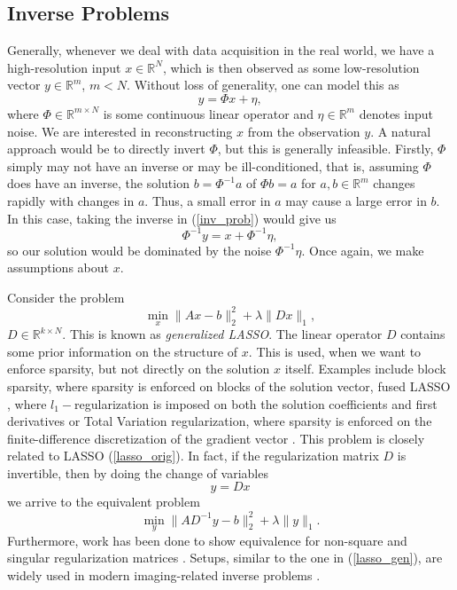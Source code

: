 \documentclass[11pt, twoside]{report}
\begin{document}
\subsection{Inverse Problems}
Generally, whenever we deal with data acquisition in the real world, we have a high-resolution input $x \in \mathbb{R}^N$, which is then observed as some low-resolution vector $y \in \mathbb{R}^m$, $m<N$. Without loss of generality, one can model this as
\begin{equation} \label{inv_prob}
    y = \Phi x + \eta,
\end{equation}
where $\Phi \in \mathbb{R}^{m \times N}$ is some continuous linear operator and $\eta \in \mathbb{R}^m$ denotes input noise. We are interested in reconstructing $x$ from the observation $y$. A natural approach would be to directly invert $\Phi$, but this is generally infeasible. Firstly, $\Phi$ simply may not have an inverse or may be ill-conditioned, that is, assuming $\Phi$ does have an inverse, the solution $b = \Phi^{-1} a$ of $\Phi b  = a$ for $a,b \in \mathbb{R}^m$ changes rapidly with changes in $a$. Thus, a small error in $a$ may cause a large error in $b$. In this case, taking the inverse in (\ref{inv_prob}) would give us
\begin{equation} \label{inv_ill}
    \Phi^{-1}y = x + \Phi^{-1}\eta,
\end{equation}
so our solution would be dominated by the noise $\Phi^{-1}\eta$. Once again, we make assumptions about $x$. 

Consider the problem
\begin{equation} \label{lasso_gen}
    \min_x  \|Ax-b\|_2^2 + \lambda\|Dx\|_1,
\end{equation}
$D \in \mathbb{R}^{k \times N}$. This is known as \textit{generalized LASSO}. The linear operator $D$ contains some prior information on the structure of $x$. This is used, when we want to enforce sparsity, but not directly on the solution $x$ itself. Examples include block sparsity, where sparsity is enforced on blocks of the solution vector, fused LASSO \cite{tibshirani_fused}, where $l_1-$regularization is imposed on both the solution coefficients and first derivatives or Total Variation regularization, where sparsity is enforced on the finite-difference discretization of the gradient vector \cite{chambolle}. This problem is closely related to LASSO (\ref{lasso_orig}). In fact, if the regularization matrix $D$ is invertible, then by doing the change of variables
\[y = Dx\]
we arrive to the equivalent problem
\begin{equation} \label{lasso_equiv}
    \min_y  \|AD^{-1}y-b\|_2^2 + \lambda\|y\|_1.
\end{equation}
Furthermore, work has been done to show equivalence for non-square and singular regularization matrices \cite{gen_lasso1}\cite{gen_lasso2}. Setups, similar to the one in (\ref{lasso_gen}), are widely used in modern imaging-related inverse problems \cite{bilevel_ictv}\cite{vega_eeg}.
\end{document}
